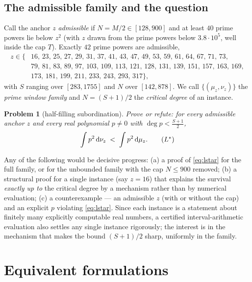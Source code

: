 \documentclass[11pt]{article}
\newtheorem{problem}{Problem}
\theoremstyle{remark}
\newcommand{\dd}{\,\mathrm{d}}
\begin{document}
\subsection{The admissible family and the question}\label{sec:family}

Call the anchor $z$ \emph{admissible} if $N=M/2\in[128,900]$ and at
least $40$ prime powers lie below $z^{2}$ (with $z$ drawn from the
prime powers below $3.8\cdot10^{5}$, well inside the cap $T$).
Exactly $42$ prime powers are admissible,
\begin{align*}
z\in\{&16,\,23,\,25,\,27,\,29,\,31,\,37,\,41,\,43,\,47,\,49,\,53,\,
59,\,61,\,64,\,67,\,71,\,73,\\
&79,\,81,\,83,\,89,\,97,\,103,\,109,\,113,\,121,\,128,\,131,\,139,\,
151,\,157,\,163,\,169,\\
&173,\,181,\,199,\,211,\,233,\,243,\,293,\,317\},
\end{align*}
with $S$ ranging over $[283,1755]$ and $N$ over $[142,878]$.  We call
$\{(\mu_z,\nu_z)\}$ the \emph{prime window family} and $N=(S+1)/2$ the
\emph{critical degree} of an instance.

\begin{problem}[half-filling subordination]\label{prob:main}
Prove or refute: for every admissible anchor $z$ and every real
polynomial $p\neq 0$ with $\deg p<\frac{S+1}{2}$,
\begin{equation}\label{eq:lstar}
\int p^{2}\dd\nu_{z}\;<\;\int p^{2}\dd\mu_{z}.
\tag{$L^{*}$}
\end{equation}
\end{problem}

Any of the following would be decisive progress: (a) a proof of
\eqref{eq:lstar} for the full family, or for the unbounded family with
the cap $N\le 900$ removed; (b) a structural proof for a single
instance (say $z=16$) that explains the survival \emph{exactly up to}
the critical degree by a mechanism rather than by numerical
evaluation; (c) a counterexample --- an admissible $z$ (with or
without the cap) and an explicit $p$ violating \eqref{eq:lstar}.
Since each instance is a statement about finitely many explicitly
computable real numbers, a certified interval-arithmetic evaluation
also settles any single instance rigorously; the interest is in the
mechanism that makes the bound $(S+1)/2$ sharp, uniformly in the
family.

\section{Equivalent formulations}\label{sec:equiv}
\end{document}
